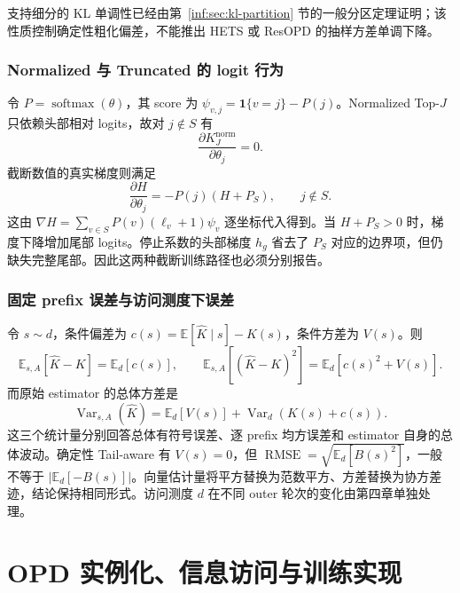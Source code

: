 \documentclass[lang=cn,scheme=chinese,openany]{../book/elegantbook}
\newcommand{\E}{\mathbb E}
\newcommand{\Var}{\operatorname{Var}}
\begin{document}
支持细分的 KL 单调性已经由第~\ref{inf:sec:kl-partition} 节的一般分区定理证明；该性质控制确定性粗化偏差，不能推出 HETS 或 ResOPD 的抽样方差单调下降。

\subsection{Normalized 与 Truncated 的 logit 行为}

令 $P=\operatorname{softmax}(\theta)$，其 score 为 $\psi_{v,j}=\mathbf1\{v=j\}-P(j)$。Normalized Top-$J$ 只依赖头部相对 logits，故对 $j\notin S$ 有
\begin{equation*}
 \frac{\partial K^{\mathrm{norm}}_J}{\partial\theta_j}=0.
\end{equation*}
截断数值的真实梯度则满足
\begin{equation*}
 \frac{\partial H}{\partial\theta_j}=-P(j)(H+P_S),\qquad j\notin S.
\end{equation*}
这由 $\nabla H=\sum_{v\in S}P(v)(\ell_v+1)\psi_v$ 逐坐标代入得到。当 $H+P_S>0$ 时，梯度下降增加尾部 logits。停止系数的头部梯度 $h_g$ 省去了 $P_S$ 对应的边界项，但仍缺失完整尾部。因此这两种截断训练路径也必须分别报告。

\subsection{固定 prefix 误差与访问测度下误差}

令 $s\sim d$，条件偏差为 $c(s)=\E[\widehat K\mid s]-K(s)$，条件方差为 $V(s)$。则
\begin{equation*}
 \E_{s,A}[\widehat K-K]=\E_d[c(s)],\qquad
 \E_{s,A}[(\widehat K-K)^2]=\E_d[c(s)^2+V(s)].
\end{equation*}
而原始 estimator 的总体方差是
\begin{equation*}
 \Var_{s,A}(\widehat K)
 =\E_d[V(s)]+\Var_d(K(s)+c(s)).
\end{equation*}
这三个统计量分别回答总体有符号误差、逐 prefix 均方误差和 estimator 自身的总体波动。确定性 Tail-aware 有 $V(s)=0$，但 $\operatorname{RMSE}=\sqrt{\E_d[B(s)^2]}$，一般不等于 $|\E_d[-B(s)]|$。向量估计量将平方替换为范数平方、方差替换为协方差迹，结论保持相同形式。访问测度 $d$ 在不同 outer 轮次的变化由第四章单独处理。





\chapter{OPD 实例化、信息访问与训练实现}
\label{opd:chapter}
\end{document}

